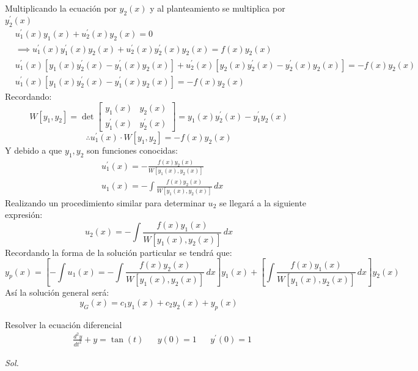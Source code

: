 Multiplicando la ecuación por $y_2(x)$ y al planteamiento se multiplica por $y_2^{\prime}(x)$
\begin{align*}
    &u_1^{\prime}(x)y_1(x)+u_2^{\prime}(x)y_2(x) = 0\\
    &\implies u_1^{\prime}(x)y_1^{\prime}(x)y_2(x) + u_2^{\prime}(x)y_2^{\prime}(x)y_2(x) = f(x)y_2(x)\\
    &u_1^{\prime}(x)\left[y_1(x)y_2^{\prime}(x) - y^{\prime}_1(x)y_2(x) \right] + u^{\prime}_2(x)\left[y_2(x)y_2^{\prime}(x) -y_2^{\prime}(x)y_2(x)\right] =-f(x)y_2(x)\\
    &u_1^{\prime}(x)\left[y_1(x)y_2^{\prime}(x) - y^{\prime}_1(x)y_2(x) \right] = -f(x)y_2(x)
\end{align*}
Recordando:
\begin{equation}
    W\left[y_1,y_2\right] = \det\begin{bmatrix}
        y_1(x) & y_2(x)\\
        y_1^{\prime}(x) & y^{\prime}_2(x)
    \end{bmatrix} = y_1(x)y_2^{\prime}(x) - y_1^{\prime}y_2(x)
\end{equation}
\begin{equation*}
    \therefore u_1^{\prime}(x)\cdot W\left[y_1,y_2\right] = - f(x)y_2(x)
\end{equation*}
Y debido a que $y_1,y_2$ son funciones conocidas:
\begin{align*}
    &u^{\prime}_1(x) =-\frac{f(x)y_2(x)}{W\left[y_1(x),y_2(x)\right]}\\
    &u_1(x) = -\int \frac{f(x)y_2(x)}{W\left[y_1(x),y_2(x)\right]}\,dx
\end{align*}
Realizando un procedimiento similar para determinar $u_2$ se llegará a la siguiente expresión:
\begin{equation*}
    u_2(x) = -\int \frac{f(x)y_1(x)}{W\left[y_1(x),y_2(x)\right]}\,dx
\end{equation*}
Recordando la forma de la solución particular se tendrá que:
\begin{equation*}
    y_p(x) = \left[ -\int u_1(x) = -\int \frac{f(x)y_2(x)}{W\left[y_1(x),y_2(x)\right]}\,dx\right] y_1(x) + \left[\int \frac{f(x)y_1(x)}{W\left[y_1(x),y_2(x)\right]}\,dx\right]y_2(x)
\end{equation*}
Así la solución general será:
\begin{equation*}
    y_G(x) = c_1y_1(x) + c_2y_2(x) +y_p(x)
\end{equation*}
\begin{example}
    Resolver la ecuación diferencial
    \begin{align*}
        &\frac{d^2y}{dt^2} +y = \tan{(t)} &&y(0) =1&& y^{\prime}(0) =1
    \end{align*}
\end{example}
\textit{ Sol. }

